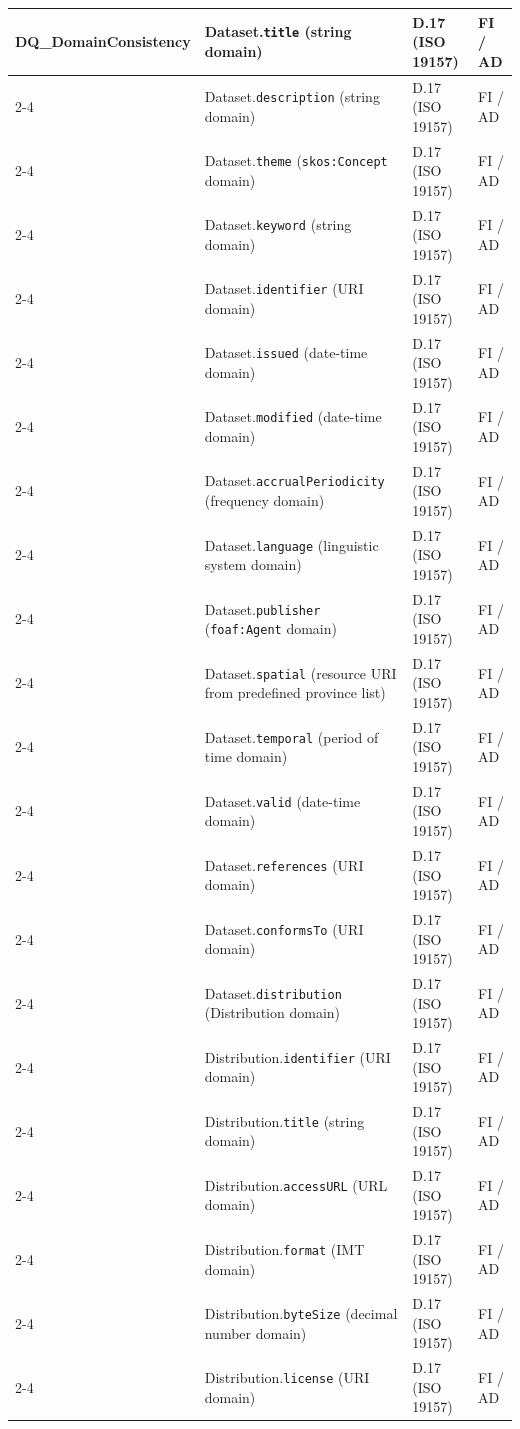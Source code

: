 {\begin{table}[h!]
\begin{tabular}{|p{4.2cm}|p{4.9cm}|p{2.0cm}|p{1.3cm}|}
DQ\_DomainConsistency
& Dataset.\texttt{title} (string domain)
& D.17 (ISO 19157)
& FI / AD \\ \cline{2-4}
& Dataset.\texttt{description} (string domain)
& D.17 (ISO 19157)
& FI / AD \\ \cline{2-4}
& Dataset.\texttt{theme} (\texttt{skos:Concept} domain)
& D.17 (ISO 19157)
& FI / AD \\ \cline{2-4}
& Dataset.\texttt{keyword} (string domain)
& D.17 (ISO 19157)
& FI / AD \\ \cline{2-4}
& Dataset.\texttt{identifier} (URI domain)
& D.17 (ISO 19157)
& FI / AD \\ \cline{2-4}
& Dataset.\texttt{issued} (date-time domain)
& D.17 (ISO 19157)
& FI / AD \\ \cline{2-4}
& Dataset.\texttt{modified} (date-time domain)
& D.17 (ISO 19157)
& FI / AD \\ \cline{2-4}
& Dataset.\texttt{accrualPeriodicity} (frequency domain)
& D.17 (ISO 19157)
& FI / AD \\ \cline{2-4}
& Dataset.\texttt{language} (linguistic system domain)
& D.17 (ISO 19157)
& FI / AD \\ \cline{2-4}
& Dataset.\texttt{publisher} (\texttt{foaf:Agent} domain)
& D.17 (ISO 19157)
& FI / AD \\ \cline{2-4}
& Dataset.\texttt{spatial} (resource URI from predefined province list)
& D.17 (ISO 19157)
& FI / AD \\ \cline{2-4}
& Dataset.\texttt{temporal} (period of time domain)
& D.17 (ISO 19157)
& FI / AD \\ \cline{2-4}
& Dataset.\texttt{valid} (date-time domain)
& D.17 (ISO 19157)
& FI / AD \\ \cline{2-4}
& Dataset.\texttt{references} (URI domain)
& D.17 (ISO 19157)
& FI / AD \\ \cline{2-4}
& Dataset.\texttt{conformsTo} (URI domain)
& D.17 (ISO 19157)
& FI / AD \\ \cline{2-4}
& Dataset.\texttt{distribution} (Distribution domain)
& D.17 (ISO 19157)
& FI / AD \\ \cline{2-4}
& Distribution.\texttt{identifier} (URI domain)
& D.17 (ISO 19157)
& FI / AD \\ \cline{2-4}
& Distribution.\texttt{title} (string domain)
& D.17 (ISO 19157)
& FI / AD \\ \cline{2-4}
& Distribution.\texttt{accessURL} (URL domain)
& D.17 (ISO 19157)
& FI / AD \\ \cline{2-4}
& Distribution.\texttt{format} (IMT domain)
& D.17 (ISO 19157)
& FI / AD \\ \cline{2-4}
& Distribution.\texttt{byteSize} (decimal number domain)
& D.17 (ISO 19157)
& FI / AD \\ \cline{2-4}
& Distribution.\texttt{license} (URI domain)
& D.17 (ISO 19157)
& FI / AD \\
\hline


\end{tabular}
\end{table}}
